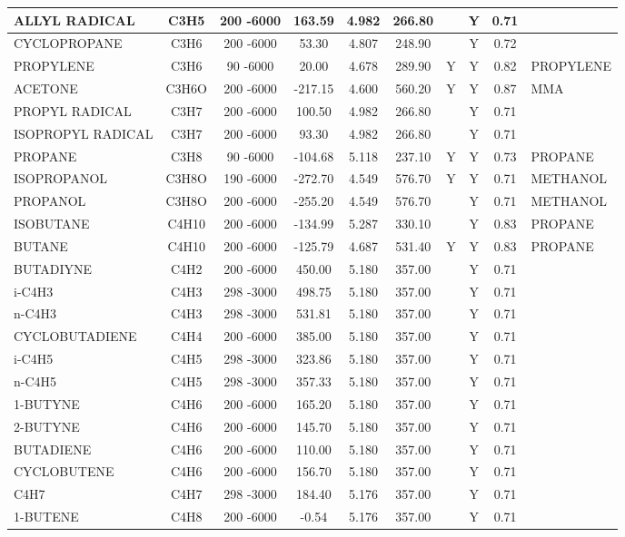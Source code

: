 \begin{longtable}{@{\extracolsep{\fill}}|l|c|c|c|c|c|c|c|c|l|}
ALLYL RADICAL&C3H5&200 -6000&  163.59& 4.982&   266.80& &Y& 0.71&\\ \hline
CYCLOPROPANE&C3H6&200 -6000&   53.30& 4.807&   248.90& &Y& 0.72&\\ \hline
PROPYLENE&C3H6&90 -6000&   20.00& 4.678&   289.90&Y&Y& 0.82&PROPYLENE\\ \hline
ACETONE&C3H6O&200 -6000& -217.15& 4.600&   560.20&Y&Y& 0.87&MMA\\ \hline
PROPYL RADICAL&C3H7&200 -6000&  100.50& 4.982&   266.80& &Y& 0.71&\\ \hline
ISOPROPYL RADICAL&C3H7&200 -6000&   93.30& 4.982&   266.80& &Y& 0.71&\\ \hline
PROPANE&C3H8&90 -6000& -104.68& 5.118&   237.10&Y&Y& 0.73&PROPANE\\ \hline
ISOPROPANOL&C3H8O&190 -6000& -272.70& 4.549&   576.70&Y&Y& 0.71&METHANOL\\ \hline
PROPANOL&C3H8O&200 -6000& -255.20& 4.549&   576.70& &Y& 0.71&METHANOL\\ \hline
ISOBUTANE&C4H10&200 -6000& -134.99& 5.287&   330.10& &Y& 0.83&PROPANE\\ \hline
BUTANE&C4H10&200 -6000& -125.79& 4.687&   531.40&Y&Y& 0.83&PROPANE\\ \hline
BUTADIYNE&C4H2&200 -6000&  450.00& 5.180&   357.00& &Y& 0.71&\\ \hline
i-C4H3&C4H3&298 -3000&  498.75& 5.180&   357.00& &Y& 0.71&\\ \hline
n-C4H3&C4H3&298 -3000&  531.81& 5.180&   357.00& &Y& 0.71&\\ \hline
CYCLOBUTADIENE&C4H4&200 -6000&  385.00& 5.180&   357.00& &Y& 0.71&\\ \hline
i-C4H5&C4H5&298 -3000&  323.86& 5.180&   357.00& &Y& 0.71&\\ \hline
n-C4H5&C4H5&298 -3000&  357.33& 5.180&   357.00& &Y& 0.71&\\ \hline
1-BUTYNE&C4H6&200 -6000&  165.20& 5.180&   357.00& &Y& 0.71&\\ \hline
2-BUTYNE&C4H6&200 -6000&  145.70& 5.180&   357.00& &Y& 0.71&\\ \hline
BUTADIENE&C4H6&200 -6000&  110.00& 5.180&   357.00& &Y& 0.71&\\ \hline
CYCLOBUTENE&C4H6&200 -6000&  156.70& 5.180&   357.00& &Y& 0.71&\\ \hline
C4H7&C4H7&298 -3000&  184.40& 5.176&   357.00& &Y& 0.71&\\ \hline
1-BUTENE&C4H8&200 -6000&   -0.54& 5.176&   357.00& &Y& 0.71&\\ \hline

\end{longtable}
